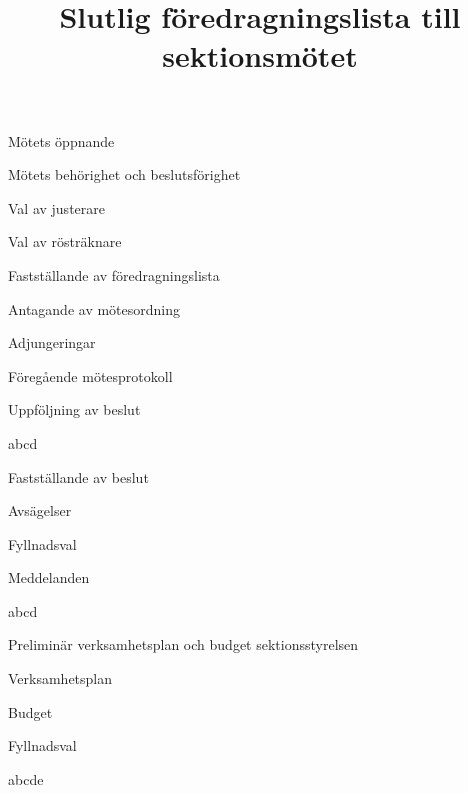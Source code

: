 \documentclass{sektionsmote}
\title{Slutlig föredragningslista till sektionsmötet}
\begin{document}
\maketitle

\begin{ootd}

\item{Mötets öppnande}

\item{Mötets behörighet och beslutsförighet}

\item{Val av justerare}

\item{Val av rösträknare}

\item{Fastställande av föredragningslista}

\item{Antagande av mötesordning}

\item{Adjungeringar}

\item{Föregående mötesprotokoll}

\item{Uppföljning av beslut}
\begin{ootd}
    \item abcd
\end{ootd}

\item{Fastställande av beslut}
\begin{ootd}
    \item Avsägelser
    \item Fyllnadsval
\end{ootd}

\item{Meddelanden}
\begin{ootd}
    \item abcd
\end{ootd}

\item{Preliminär verksamhetsplan och budget sektionsstyrelsen}
\begin{ootd}
    \item Verksamhetsplan
    \item Budget
\end{ootd}

\item{Fyllnadsval}
\begin{ootd}
    \item abcde
\end{ootd}



\end{ootd}
\end{document}
